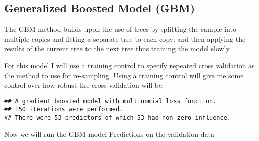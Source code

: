 \documentclass[]{article}
\newenvironment{Shaded}{\begin{snugshade}}{\end{snugshade}}
\newcommand{\DataTypeTok}[1]{\textcolor[rgb]{0.13,0.29,0.53}{#1}}
\newcommand{\DecValTok}[1]{\textcolor[rgb]{0.00,0.00,0.81}{#1}}
\newcommand{\KeywordTok}[1]{\textcolor[rgb]{0.13,0.29,0.53}{\textbf{#1}}}
\newcommand{\NormalTok}[1]{#1}
\newcommand{\OperatorTok}[1]{\textcolor[rgb]{0.81,0.36,0.00}{\textbf{#1}}}
\newcommand{\OtherTok}[1]{\textcolor[rgb]{0.56,0.35,0.01}{#1}}
\newcommand{\StringTok}[1]{\textcolor[rgb]{0.31,0.60,0.02}{#1}}
\begin{document}
\hypertarget{generalized-boosted-model-gbm}{%
\subsection{Generalized Boosted Model
(GBM)}\label{generalized-boosted-model-gbm}}

The GBM method builds upon the use of trees by splitting the sample into
multiple copies and fitting a separate tree to each copy, and then
applying the results of the current tree to the next tree thus training
the model slowly.

For this model I will use a training control to specify repeated cross
validation as the method to use for re-sampling. Using a training
control will give me some control over how robust the cross validation
will be.

\begin{Shaded}
\end{Shaded}

\begin{verbatim}
## A gradient boosted model with multinomial loss function.
## 150 iterations were performed.
## There were 53 predictors of which 53 had non-zero influence.
\end{verbatim}

Now we will run the GBM model Predictions on the validation data

\begin{Shaded}
\end{Shaded}
\end{document}
